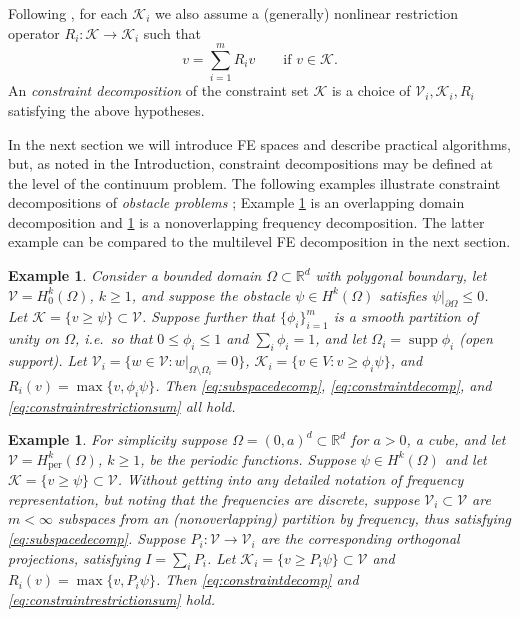 \documentclass[letterpaper,final,12pt,reqno]{amsart}
\theoremstyle{cstyle}
\theoremstyle{dstyle}
\newtheorem{example}[theorem]{Example}
\numberwithin{equation}{section}
\numberwithin{figure}{section}
\numberwithin{table}{section}
\numberwithin{theorem}{section}
\newcommand{\RR}{\mathbb{R}}
\newcommand{\cK}{\mathcal{K}}
\newcommand{\cV}{\mathcal{V}}
\newcommand{\supp}{\operatorname{supp}}
\begin{document}
Following \cite{Tai2003}, for each $\cK_i$ we also assume a (generally) nonlinear restriction operator $R_i : \cK \to \cK_i$ such that
\begin{equation}
v = \sum_{i=1}^m R_i v \qquad \text{if } v \in \cK.  \label{eq:constraintrestrictionsum}
\end{equation}
An \emph{constraint decomposition} of the constraint set $\cK$ is a choice of $\cV_i,\cK_i,R_i$ satisfying the above hypotheses.

In the next section we will introduce FE spaces and describe practical algorithms, but, as noted in the Introduction, constraint decompositions may be defined at the level of the continuum problem.  The following examples illustrate constraint decompositions of \emph{obstacle problems} \cite{GraeserKornhuber2009}; Example \ref{ex:domaindecomposition} is an overlapping domain decomposition and \ref{ex:frequencydecomposition} is a nonoverlapping frequency decomposition.  The latter example can be compared to the multilevel FE decomposition in the next section.

\begin{example}  \label{ex:domaindecomposition}  Consider a bounded domain $\Omega \subset \RR^d$ with polygonal boundary, let $\cV = H_0^k(\Omega)$, $k\ge 1$, and suppose the obstacle $\psi \in H^k(\Omega)$ satisfies $\psi|_{\partial \Omega} \le 0$.  Let $\cK = \{v \ge \psi\} \subset \cV$.  Suppose further that $\{\phi_i\}_{i=1}^m$ is a smooth partition of unity on $\Omega$, i.e.~so that $0 \le \phi_i\le 1$ and $\sum_i \phi_i = 1$, and let $\Omega_i = \supp \phi_i$ (open support).  Let $\cV_i = \{w \in \cV:w|_{\Omega \setminus \Omega_i} =0 \}$, $\cK_i = \{v \in V: v \ge \phi_i \psi\}$, and $R_i(v) = \max\{v,\phi_i \psi\}$.  Then \eqref{eq:subspacedecomp}, \eqref{eq:constraintdecomp}, and \eqref{eq:constraintrestrictionsum} all hold.
\end{example}

\begin{example}  \label{ex:frequencydecomposition}  For simplicity suppose $\Omega = (0,a)^d \subset \RR^d$ for $a>0$, a cube, and let $\cV = H_{\text{per}}^k(\Omega)$, $k\ge 1$, be the periodic functions.  Suppose $\psi \in H^k(\Omega)$ and let $\cK = \{v \ge \psi\} \subset \cV$.  Without getting into any detailed notation of frequency representation, but noting that the frequencies are discrete, suppose $\cV_i \subset \cV$ are $m<\infty$ subspaces from an (nonoverlapping) partition by frequency, thus satisfying \eqref{eq:subspacedecomp}.  Suppose $P_i:\cV \to \cV_i$ are the corresponding orthogonal projections, satisfying $I = \sum_i P_i$.  Let $\cK_i = \{v \ge P_i \psi\} \subset \cV$ and $R_i(v) = \max\{v,P_i \psi\}$.  Then \eqref{eq:constraintdecomp} and \eqref{eq:constraintrestrictionsum} hold.
\end{example}
\end{document}
